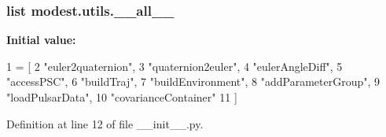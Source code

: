 \subsubsection[{\texorpdfstring{\+\_\+\+\_\+all\+\_\+\+\_\+}{__all__}}]{\setlength{\rightskip}{0pt plus 5cm}list modest.\+utils.\+\_\+\+\_\+all\+\_\+\+\_\+\hspace{0.3cm}{\ttfamily [private]}}\hypertarget{namespacemodest_1_1utils_acd9a8b6ab3a03ab38f1c184c44fb92cb}{}\label{namespacemodest_1_1utils_acd9a8b6ab3a03ab38f1c184c44fb92cb}
{\bfseries Initial value\+:}
\begin{DoxyCode}
1 = [
2     \textcolor{stringliteral}{"euler2quaternion"},
3     \textcolor{stringliteral}{"quaternion2euler"},
4     \textcolor{stringliteral}{"eulerAngleDiff"},
5     \textcolor{stringliteral}{"accessPSC"},
6     \textcolor{stringliteral}{"buildTraj"},
7     \textcolor{stringliteral}{"buildEnvironment"},
8     \textcolor{stringliteral}{"addParameterGroup"},
9     \textcolor{stringliteral}{"loadPulsarData"},
10     \textcolor{stringliteral}{"covarianceContainer"}
11 ]
\end{DoxyCode}


Definition at line 12 of file \+\_\+\+\_\+init\+\_\+\+\_\+.\+py.

